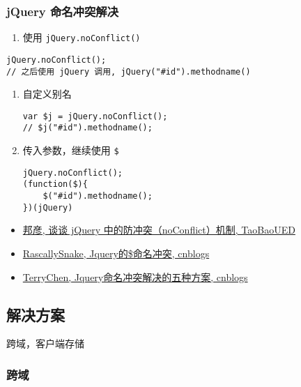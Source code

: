 \subsubsection{jQuery
命名冲突解决}\label{jquery-ux547dux540dux51b2ux7a81ux89e3ux51b3}

\begin{enumerate}
\def\labelenumi{\arabic{enumi}.}
\tightlist
\item
  使用 \lstinline!jQuery.noConflict()!
\end{enumerate}

\begin{lstlisting}
jQuery.noConflict();
// 之后使用 jQuery 调用, jQuery("#id").methodname()
\end{lstlisting}

\begin{enumerate}
\def\labelenumi{\arabic{enumi}.}
\setcounter{enumi}{1}
\item
  自定义别名

\begin{lstlisting}
var $j = jQuery.noConflict();
// $j("#id").methodname();
\end{lstlisting}
\item
  传入参数，继续使用 \lstinline!$!

\begin{lstlisting}
jQuery.noConflict();
(function($){
    $("#id").methodname();
})(jQuery)
\end{lstlisting}
\end{enumerate}

\begin{itemize}
\tightlist
\item
  \href{http://ued.taobao.org/blog/2013/03/jquery-noconflict/}{邦彦,
  谈谈 jQuery 中的防冲突（noConflict）机制, TaoBaoUED}
\item
  \href{http://www.cnblogs.com/RascallySnake/archive/2010/05/07/1729417.html}{RascallySnake,
  Jquery的\$命名冲突, cnblogs}
\item
  \href{http://www.cnblogs.com/ForEvErNoME/archive/2012/03/15/2398659.html}{TerryChen,
  Jquery命名冲突解决的五种方案, cnblogs}
\end{itemize}

\subsection{解决方案}\label{ux89e3ux51b3ux65b9ux6848}

跨域，客户端存储

\subsubsection{跨域}\label{ux8de8ux57df}

